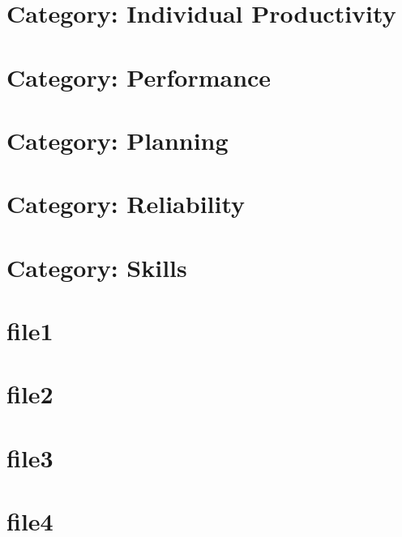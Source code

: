 \documentclass[twoside]{book}
\newcommand{\+}{\discretionary{\mbox{\scriptsize$\hookleftarrow$}}{}{}}
\begin{document}
\chapter{Category\+: Individual Productivity}
\label{md_markdown_category_individual_productivity}

\chapter{Category\+: Performance}
\label{md_markdown_category_performance}

\chapter{Category\+: Planning}
\label{md_markdown_category_planning}

\chapter{Category\+: Reliability}
\label{md_markdown_category_reliability}

\chapter{Category\+: Skills}
\label{md_markdown_category_skills}

\chapter{file1}
\label{md_markdown_file1}

\chapter{file2}
\label{md_markdown_file2}

\chapter{file3}
\label{md_markdown_file3}

\chapter{file4}
\label{md_markdown_file4}

\end{document}
